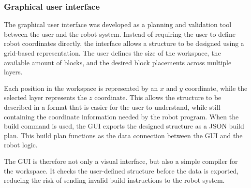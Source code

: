 \subsubsection{Graphical user interface}

The graphical user interface was developed as a planning and validation tool between the user and the robot system. Instead of requiring the user to define robot coordinates directly, the interface allows a structure to be designed using a grid-based representation. The user defines the size of the workspace, the available amount of blocks, and the desired block placements across multiple layers.

Each position in the workspace is represented by an $x$ and $y$ coordinate, while the selected layer represents the $z$ coordinate. This allows the structure to be described in a format that is easier for the user to understand, while still containing the coordinate information needed by the robot program. When the build command is used, the GUI exports the designed structure as a JSON build plan. This build plan functions as the data connection between the GUI and the robot logic.

The GUI is therefore not only a visual interface, but also a simple compiler for the workspace. It checks the user-defined structure before the data is exported, reducing the risk of sending invalid build instructions to the robot system.
